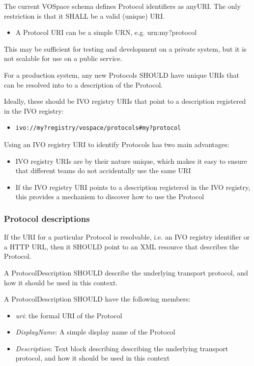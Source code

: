 \documentclass[11pt,a4paper]{ivoa}
\begin{document}
The current VOSpace schema defines Protocol identifiers as anyURI. The only restriction is that it SHALL be a valid (unique) URI.

\begin{itemize}
    \item A Protocol URI can be a simple URN, e.g. urn:my?protocol
\end{itemize}

This may be sufficient for testing and development on a private system, but it is not scalable for use on a public service.

For a production system, any new Protocols SHOULD have unique URIs that can be resolved into to a description of the Protocol.

Ideally, these should be IVO registry URIs that point to a description registered in the IVO registry:

\begin{itemize}
    \item \begin{verbatim}ivo://my?registry/vospace/protocols#my?protocol\end{verbatim}
\end{itemize}

Using an IVO registry URI to identify Protocols has two main advantages:

\begin{itemize}
    \item IVO registry URIs are by their nature unique, which makes it easy to ensure that different teams do not accidentally use the same URI
    \item If the IVO registry URI points to a description registered in the IVO registry, this provides a mechanism to discover how to use the Protocol
\end{itemize}

\subsubsection{Protocol descriptions}
If the URI for a particular Protocol is resolvable, i.e. an IVO registry identifier or a HTTP URL, then it SHOULD point to an XML resource that describes the Protocol.

A ProtocolDescription SHOULD describe the underlying transport protocol, and how it should be used in this context.

A ProtocolDescription SHOULD have the following members:

\begin{itemize}
    \item \emph{uri}: the formal URI of the Protocol
    \item \emph{DisplayName}: A simple display name of the Protocol
    \item \emph{Description}: Text block describing describing the underlying transport protocol, and how it should be used in this context
\end{itemize}
\end{document}

